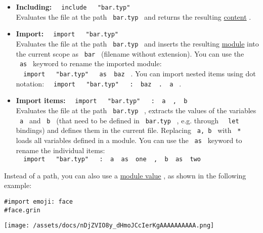 \begin{itemize}
\item
  \textbf{Including:}
  \texttt{\ }{\texttt{\ include\ }}\texttt{\ }{\texttt{\ "bar.typ"\ }}\texttt{\ }\\
  Evaluates the file at the path \texttt{\ bar.typ\ } and returns the
  resulting \href{/docs/reference/foundations/content/}{content} .
\item
  \textbf{Import:}
  \texttt{\ }{\texttt{\ import\ }}\texttt{\ }{\texttt{\ "bar.typ"\ }}\texttt{\ }\\
  Evaluates the file at the path \texttt{\ bar.typ\ } and inserts the
  resulting \href{/docs/reference/foundations/module/}{module} into the
  current scope as \texttt{\ bar\ } (filename without extension). You
  can use the \texttt{\ as\ } keyword to rename the imported module:
  \texttt{\ }{\texttt{\ import\ }}\texttt{\ }{\texttt{\ "bar.typ"\ }}\texttt{\ }{\texttt{\ as\ }}\texttt{\ baz\ }
  . You can import nested items using dot notation:
  \texttt{\ }{\texttt{\ import\ }}\texttt{\ }{\texttt{\ "bar.typ"\ }}\texttt{\ }{\texttt{\ :\ }}\texttt{\ baz\ }{\texttt{\ .\ }}\texttt{\ a\ }
  .
\item
  \textbf{Import items:}
  \texttt{\ }{\texttt{\ import\ }}\texttt{\ }{\texttt{\ "bar.typ"\ }}\texttt{\ }{\texttt{\ :\ }}\texttt{\ a\ }{\texttt{\ ,\ }}\texttt{\ b\ }\\
  Evaluates the file at the path \texttt{\ bar.typ\ } , extracts the
  values of the variables \texttt{\ a\ } and \texttt{\ b\ } (that need
  to be defined in \texttt{\ bar.typ\ } , e.g. through
  \texttt{\ }{\texttt{\ let\ }}\texttt{\ } bindings) and defines them in
  the current file. Replacing \texttt{\ a,\ b\ } with \texttt{\ *\ }
  loads all variables defined in a module. You can use the
  \texttt{\ as\ } keyword to rename the individual items:
  \texttt{\ }{\texttt{\ import\ }}\texttt{\ }{\texttt{\ "bar.typ"\ }}\texttt{\ }{\texttt{\ :\ }}\texttt{\ a\ }{\texttt{\ as\ }}\texttt{\ one\ }{\texttt{\ ,\ }}\texttt{\ b\ }{\texttt{\ as\ }}\texttt{\ two\ }
\end{itemize}

Instead of a path, you can also use a
\href{/docs/reference/foundations/module/}{module value} , as shown in
the following example:

\begin{verbatim}
#import emoji: face
#face.grin
\end{verbatim}

\texttt{[image: /assets/docs/nDjZVIO8y\_dHmoJCcIerKgAAAAAAAAAA.png]}

